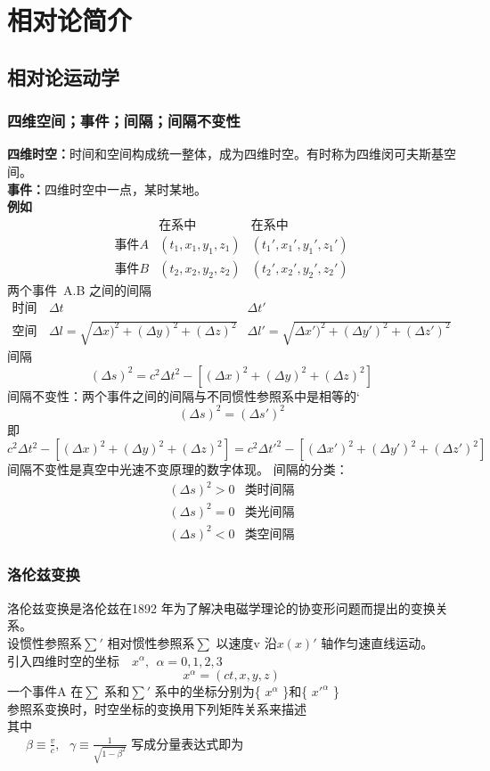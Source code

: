 \chapter{相对论简介}
\section{相对论运动学}
\subsection{四维空间；事件；间隔；间隔不变性}
\textbf{四维时空：}时间和空间构成统一整体，成为四维时空。有时称为四维闵可夫斯基空间。\\
\textbf{事件：}四维时空中一点，某时某地。\\
\textbf{例如}\\
$$
\begin{array}{lll}
 &\text{在系中}&\text{在系中}\\
\text{事件}A&(t_{1},x_{1},y_{1},z_{1})&(t_{1}',x_{1}',y_{1}',z_{1}')\\
\text{事件}B&(t_{2},x_{2},y_{2},z_{2})&(t_{2}',x_{2}',y_{2}',z_{2}')
\end{array}
$$
两个事件~A.B 之间的间隔\\
$$
\begin{array}{lcc}
\text{时间间隔}&\Delta t&\Delta t'\\
\text{空间间隔}&\Delta l=\sqrt{\Delta x)^{2}+(\Delta y)^{2}+(\Delta z)^{2}}&\Delta l'=\sqrt{\Delta x')^{2}+(\Delta y')^{2}+(\Delta z')^{2}}
\end{array}
$$
间隔$$(\Delta s)^{2}=c^{2}\Delta t^{2}-[(\Delta x)^{2}+(\Delta y)^{2}+(\Delta z)^{2}]$$
间隔不变性：两个事件之间的间隔与不同惯性参照系中是相等的‘
$$(\Delta s)^{2}=(\Delta s')^{2}$$
即$$c^{2}\Delta t^{2}-[(\Delta x)^{2}+(\Delta y)^{2}+(\Delta z)^{2}]=c^{2}\Delta t'^{2}-[(\Delta x')^{2}+(\Delta y')^{2}+(\Delta z')^{2}]$$
间隔不变性是真空中光速不变原理的数字体现。
间隔的分类：
$$
\begin{array}{cc}
(\Delta s)^{2}>0&\text{类时间隔}\\
(\Delta s)^{2}=0&\text{类光间隔}\\
(\Delta s)^{2}<0&\text{类空间隔}
\end{array}
$$
\subsection{洛伦兹变换}
洛伦兹变换是洛伦兹在1892 年为了解决电磁学理论的协变形问题而提出的变换关系。\\
设惯性参照系$\sum'$ 相对惯性参照系$\sum$ 以速度v 沿$x(x)'$ 轴作匀速直线运动。\\
引入四维时空的坐标\ \ $x^{\alpha},\ \ \alpha=0,1,2,3$\\
$${x^{\alpha}}=(ct,x,y,z)$$
一个事件A 在$\sum$ 系和$\sum'$ 系中的坐标分别为\{ $x^{\alpha}$ \}和\{ $x'^{\alpha}$ \}\\
参照系变换时，时空坐标的变换用下列矩阵关系来描述\\
其中\\
\ \ \ $\beta \equiv \frac{v}{c},\ \ \ \gamma \equiv \frac{1}{\sqrt{1-\beta^{2}}}$
写成分量表达式即为\\

